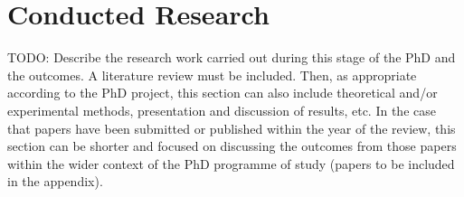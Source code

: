 \section{Conducted Research}
TODO: Describe the research work carried out during this stage of the PhD and the outcomes. A literature review must be included. Then, as appropriate according to the PhD project, this section can also include theoretical and/or experimental methods, presentation and discussion of results, etc. In the case that papers have been submitted or published within the year of the review, this section can be shorter and focused on discussing the outcomes from those papers within the wider context of the PhD programme of study (papers to be included in the appendix).